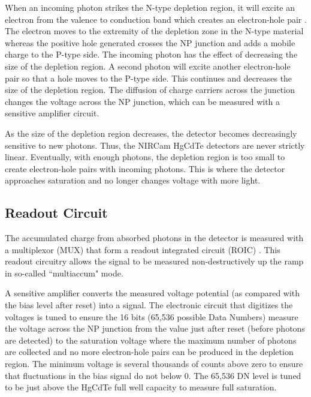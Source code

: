 \documentclass{aastex62}
\begin{document}
When an incoming photon strikes the N-type depletion region, it will excite an electron from the valence to conduction band which creates an electron-hole pair \citep{rieke2007irDetectorReview}.
The electron moves to the extremity of the depletion zone in the N-type material whereas the positive hole generated crosses the NP junction and adds a mobile charge to the P-type side.
The incoming photon has the effect of decreasing the size of the depletion region.
A second photon will excite another electron-hole pair so that a hole moves to the P-type side.
This continues and decreases the size of the depletion region.
The diffusion of charge carriers across the junction changes the voltage across the NP junction, which can be measured with a sensitive amplifier circuit.

As the size of the depletion region decreases, the detector becomes decreasingly sensitive to new photons.
Thus, the NIRCam HgCdTe detectors are never strictly linear.
Eventually, with enough photons, the depletion region is too small to create electron-hole pairs with incoming photons.
This is where the detector approaches saturation and no longer changes voltage with more light.

\subsection{Readout Circuit}\label{sec:readout}

The accumulated charge from absorbed photons in the detector is measured with a multiplexor (MUX) that form a readout integrated circuit (ROIC) \citep{rieke2007irDetectorReview}.
This readout circuitry allows the signal to be measured non-destructively up the ramp in so-called ``multiaccum" mode.

A sensitive amplifier converts the measured voltage potential (as compared with the bias level after reset) into a signal.
The electronic circuit that digitizes the voltages is tuned to ensure the 16 bits (65,536 possible Data Numbers) measure the voltage across the NP junction from the value just after reset (before photons are detected) to the saturation voltage where the maximum number of photons are collected and no more electron-hole pairs can be produced in the depletion region.
The minimum voltage is several thousands of counts above zero to ensure that fluctuations in the bias signal do not below 0.
The 65,536 DN level is tuned to be just above the HgCdTe full well capacity to measure full saturation.
\end{document}
